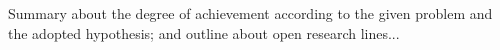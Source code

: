 Summary about the degree of achievement according to the given problem and the adopted hypothesis; and outline about open research lines...